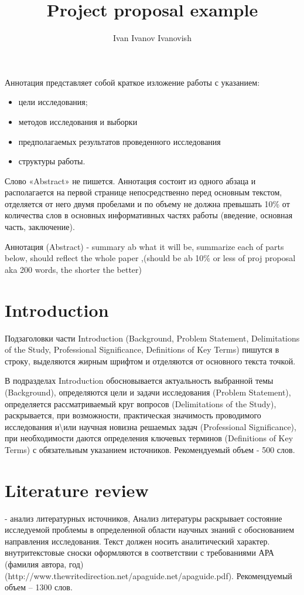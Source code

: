\documentclass[PI]{ProjectProposal}
\title{Project proposal example}
\author{Ivan Ivanov Ivanovish}
\begin{document}
\maketitle
Аннотация представляет собой краткое изложение работы с указанием:
\begin{itemize}
  \item цели исследования;
  \item методов исследования и выборки
  \item предполагаемых результатов проведенного исследования
  \item структуры работы.
\end{itemize}
Слово «Abstract» не пишется. Аннотация состоит из одного абзаца и располагается на первой странице непосредственно перед основным текстом, отделяется от него двумя пробелами и по объему не должна превышать 10\% от количества слов в основных информативных частях работы (введение, основная часть, заключение).
\par Аннотация (Abstract) - summary ab what it will be, summarize each of parts below, should reflect the whole paper ,(should be ab 10\% or less of proj proposal aka 200 words, the shorter the better)
\chapter*{Introduction}
Подзаголовки части Introduction (Background, Problem Statement, Delimitations of the Study, Professional Significance, Definitions of Key Terms) пишутся в строку, выделяются жирным шрифтом и отделяются от основного текста точкой.

В подразделах Introduction обосновывается актуальность выбранной темы (Background), определяются цели и задачи исследования (Problem Statement), определяется рассматриваемый круг вопросов (Delimitations of the Study), раскрывается, при возможности, практическая значимость проводимого исследования и\textbackslash или научная новизна решаемых задач (Professional Significance), при необходимости даются определения ключевых терминов (Definitions of Key Terms) с обязательным указанием источников. Рекомендуемый объем - 500 слов. \cite{HSEDocuments}
\chapter*{Literature review}
- анализ литературных источников,
Анализ литературы раскрывает состояние исследуемой проблемы в определенной области научных знаний с обоснованием направления исследования. Текст должен носить аналитический характер. внутритекстовые сноски оформляются в соответствии с требованиями АРА (фамилия автора, год) (http://www.thewritedirection.net/apaguide.net/apaguide.pdf). Рекомендуемый объем – 1300 слов.
\end{document}
